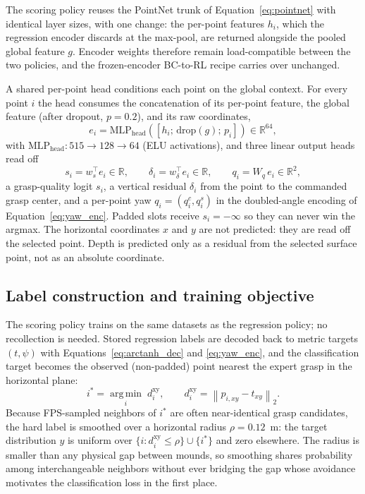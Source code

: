 The scoring policy reuses the PointNet trunk of
Equation~\eqref{eq:pointnet} with identical layer sizes, with one change: the
per-point features $h_i$, which the regression encoder discards at the
max-pool, are returned alongside the pooled global feature $g$. Encoder
weights therefore remain load-compatible between the two policies, and the
frozen-encoder BC-to-RL recipe carries over unchanged.

A shared per-point head conditions each point on the global context. For
every point $i$ the head consumes the concatenation of its per-point feature,
the global feature (after dropout, $p = 0.2$), and its raw coordinates,
\begin{equation}
  e_i = \mathrm{MLP}_{\mathrm{head}}\!\left( \left[ h_i;\, \mathrm{drop}(g);\, p_i \right] \right)
  \in \mathbb{R}^{64},
\end{equation}
with $\mathrm{MLP}_{\mathrm{head}}: 515 \to 128 \to 64$ (ELU activations),
and three linear output heads read off
\begin{equation}
  s_i = w_s^\top e_i \in \mathbb{R}, \qquad
  \delta_i = w_\delta^\top e_i \in \mathbb{R}, \qquad
  q_i = W_q\, e_i \in \mathbb{R}^2,
\end{equation}
a grasp-quality logit $s_i$, a vertical residual $\delta_i$ from the point to
the commanded grasp center, and a per-point yaw $q_i = (q_i^c, q_i^s)$ in the
doubled-angle encoding of Equation~\eqref{eq:yaw_enc}. Padded slots receive
$s_i = -\infty$ so they can never win the argmax. The horizontal coordinates
$x$ and $y$ are not predicted: they are read off the selected point. Depth is predicted
only as a residual from the selected surface point, not as an absolute
coordinate.

\subsection{Label construction and training objective}
\label{sec:bc_scoring_loss}

The scoring policy trains on the same datasets as the regression policy; no
recollection is needed. Stored regression labels are decoded back to metric
targets $(t, \psi)$ with Equations~\eqref{eq:arctanh_dec} and
\eqref{eq:yaw_enc}, and the classification target becomes the observed
(non-padded) point nearest the expert grasp in the horizontal plane:
\begin{equation}
  i^* = \operatorname*{arg\,min}_{i}\; d^{\mathrm{xy}}_i, \qquad
  d^{\mathrm{xy}}_i = \left\lVert p_{i,xy} - t_{xy} \right\rVert_2 .
\end{equation}
Because FPS-sampled neighbors of $i^*$ are often near-identical grasp
candidates, the hard label is smoothed over a horizontal radius
$\rho = 0.12$~m: the target distribution $y$ is uniform over
$\{ i : d^{\mathrm{xy}}_i \le \rho \} \cup \{ i^* \}$ and zero elsewhere. The radius is
smaller than any physical gap between mounds, so smoothing shares probability
among interchangeable neighbors without ever bridging the gap whose avoidance
motivates the classification loss in the first place.

